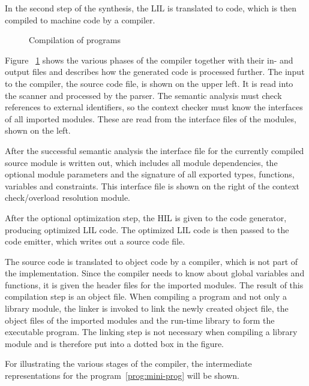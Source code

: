In the second step of the synthesis, the LIL is translated to \cee{}
code, which is then compiled to machine code by a \cee{} compiler.

\begin{figure}
\begin{center}

\end{center}
\caption{Compilation of \turtle{} programs}
\label{pic:compiling}
\end{figure}

Figure ~\ref{pic:compiling} shows the various phases of the compiler
together with their in- and output files and describes how the
generated \cee{} code is processed further.  The input to the
compiler, the source code file, is shown on the upper left.  It is
read into the scanner and processed by the parser.  The semantic
analysis must check references to external identifiers, so the context
checker must know the interfaces of all imported modules.  These are
read from the interface files of the modules, shown on the left.

After the successful semantic analysis the interface file for the
currently compiled source module is written out, which includes all
module dependencies, the optional module parameters and the signature
of all exported types, functions, variables and constraints.  This
interface file is shown on the right of the context check/overload
resolution module.

After the optional optimization step, the HIL is given to the code
generator, producing optimized LIL code.  The optimized LIL code is
then passed to the code emitter, which writes out a \cee{} source code
file.


The \cee{} source code is translated to object code by a \cee{}
compiler, which is not part of the \turtle{} implementation.  Since
the \cee{} compiler needs to know about global variables and
functions, it is given the header files for the imported modules.  The
result of this compilation step is an object file.  When compiling a
program and not only a library module, the linker is invoked to link
the newly created object file, the object files of the imported
modules and the \turtle{} run-time library to form the executable
program. The linking step is not necessary when compiling a library
module and is therefore put into a dotted box in the figure.

For illustrating the various stages of the compiler, the intermediate
representations for the \turtle{} program~\ref{prog:mini-prog} will be
shown.

